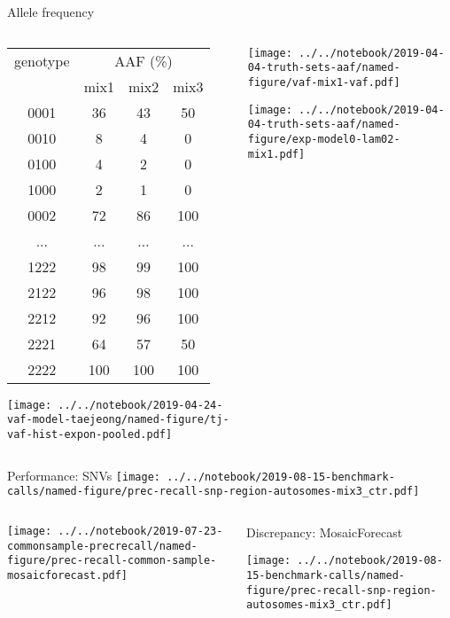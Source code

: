 \documentclass{beamer}
\begin{document}
\begin{frame}{Allele frequency}
\begin{columns}[t]
\begin{column}{0.5\textwidth}

{\tiny
\begin{tabular}{c|ccc}
genotype & \multicolumn{3}{c}{AAF (\%)} \\
& mix1 &  mix2 & mix3 \\
\hline
0001 & 36 & 43 & 50\\
0010 & 8 & 4 & 0\\
0100 & 4 & 2 & 0\\
1000 & 2 & 1 & 0\\
0002 & 72 & 86 & 100\\
... & ... & ... & ...\\
1222 & 98 & 99 & 100\\
2122 & 96 & 98 & 100\\
2212 & 92 & 96 & 100\\
2221 & 64 & 57 & 50\\
2222 & 100 & 100 & 100\\
\end{tabular}
}

\texttt{[image: ../../notebook/2019-04-24-vaf-model-taejeong/named-figure/tj-vaf-hist-expon-pooled.pdf]}

\end{column}

\begin{column}{0.5\textwidth}

\texttt{[image: ../../notebook/2019-04-04-truth-sets-aaf/named-figure/vaf-mix1-vaf.pdf]}

\texttt{[image: ../../notebook/2019-04-04-truth-sets-aaf/named-figure/exp-model0-lam02-mix1.pdf]}
\end{column}
\end{columns}
\end{frame}

\begin{frame}{Performance: SNVs}
\texttt{[image: ../../notebook/2019-08-15-benchmark-calls/named-figure/prec-recall-snp-region-autosomes-mix3\_ctr.pdf]}
\end{frame}

\begin{frame}
\begin{columns}[t]
\begin{column}{0.5\textwidth}

\texttt{[image: ../../notebook/2019-07-23-commonsample-precrecall/named-figure/prec-recall-common-sample-mosaicforecast.pdf]}
\end{column}

\begin{column}{0.5\textwidth}{Discrepancy: MosaicForecast}

\texttt{[image: ../../notebook/2019-08-15-benchmark-calls/named-figure/prec-recall-snp-region-autosomes-mix3\_ctr.pdf]}
\end{column}
\end{columns}
\end{frame}
\end{document}
